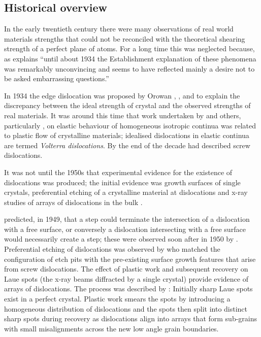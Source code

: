 \FloatBarrier

\subsection{Historical overview}


In the early twentieth century there were many observations of real world materials strengths that could not be reconciled with the theoretical shearing strength of a perfect plane of atoms. For a long time this was neglected because, as \citet{gordon1991} explains ``until about 1934 the Establishment explanation of these phenomena was remarkably unconvincing and seems to have reflected mainly a desire not to be asked embarrassing questions.''

In 1934 the edge dislocation was proposed by Orowan \cite{orowan1934i,Orowan1934ii,Orowan1934iii}, \citet{Taylor1934}, and \citet{polanyi1934} to explain the discrepancy between the ideal strength of crystal and the observed strengths of real materials. It was around this time that work undertaken by \citet{Volterra1907} and others, particularly \citet{love1920},
on elastic behaviour of homogeneous isotropic continua was related to plastic flow of crystalline materials; idealised dislocations in elastic continua are termed \emph{Volterra dislocations}. By the end of the decade \citet{burgers1939} had described screw dislocations. 

It was not until the 1950s that experimental evidence for the existence of dislocations was produced; the initial evidence was growth surfaces of single crystals, preferential etching of a crystalline material at dislocations and x-ray studies of arrays of dislocations in the bulk \cite{Forty1954}. 

\citet{Frank1949} predicted, in 1949, that a step could terminate the intersection of a dislocation with a free surface, or conversely a dislocation intersecting with a free surface would necessarily create a step; these were observed soon after in 1950 by \citet{Griffin1950}. Preferential etching of dislocations was observed by \citet{horn1952holes} who matched the configuration of etch pits with the pre-existing surface growth features that arise from screw dislocations. The effect of plastic work and subsequent recovery on Laue spots (the x-ray beams diffracted by a single crystal) provide evidence of arrays of dislocations. The process was described by \citet{Cottrell1949}: Initially sharp Laue spots exist in a perfect crystal. Plastic work smears the spots by introducing a homogeneous distribution of dislocations and the spots then split into distinct sharp spots during recovery as dislocations align into arrays that form sub-grains with small misalignments across the new low angle grain boundaries.


